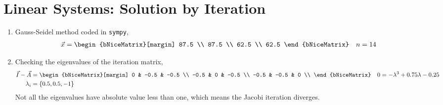 \section{Linear Systems: Solution by Iteration}

\begin{enumerate}
    \item Gauss-Seidel method coded in \texttt{sympy},
          \begin{align}
              \vec{x} & = \begin{bNiceMatrix}[margin]
                              87.5 \\ 87.5 \\ 62.5 \\ 62.5
                          \end{bNiceMatrix} &
              n       & = 14
          \end{align}

    \item Checking the eigenvalues of the iteration matrix,
          \begin{align}
              \vec{I} - \vec{A} & = \begin{bNiceMatrix}[margin]
                                        0    & -0.5 & -0.5 \\
                                        -0.5 & 0    & -0.5 \\
                                        -0.5 & -0.5 & 0    \\
                                    \end{bNiceMatrix}    &
              0                 & = -\lambda^3 + 0.75\lambda -0.25 \\
              \lambda_i         & = \{0.5, 0.5, -1\}
          \end{align}
          Not all the eigenvalues have absolute value less than one, which means
          the Jacobi iteration diverges.


\end{enumerate}
